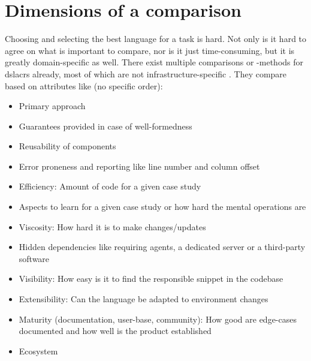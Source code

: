 \section{Dimensions of a comparison}
Choosing and selecting the best language for a task is hard. Not only is it hard to agree on what is important to compare, nor is it just time-consuming, but it is greatly domain-specific as well.
There exist multiple comparisons or -methods for \gls{dslacr}s already, most of which are not infrastructure-specific \cite{comparative_study_dsl_tools} \cite{comparing_gpl_dsl} \cite{dsl_for_iac} \cite{allgemeine_modeltheorie}. %
They compare based on attributes like (no specific order):

\begin{itemize}
  \item Primary approach \cite{comparative_study_of_dsl_tools}
  \item Guarantees provided in case of well-formedness \cite{comparative_study_of_dsl_tools} %
  \item Reusability of components \cite{comparative_study_of_dsl_tools}
  \item Error proneness and reporting like line number and column offset \cite{comparative_study_of_dsl_tools} \cite{comparing_gpl_dsl}
  \item Efficiency: Amount of code for a given case study \cite{comparative_study_of_dsl_tools}
  \item Aspects to learn for a given case study or how hard the mental operations are \cite{comparative_study_of_dsl_tools} %
  \item Viscosity: How hard it is to make changes/updates \cite{comparing_gpl_dsl}
  \item Hidden dependencies like requiring agents, a dedicated server or a third-party software \cite{comparing_gpl_dsl}
  \item Visibility: How easy is it to find the responsible snippet in the codebase \cite{comparing_gpl_dsl}
  \item Extensibility: Can the language be adapted to environment changes
  \item Maturity (documentation, user-base, community): How good are edge-cases documented and how well is the product established
  \item Ecosystem
\end{itemize}

